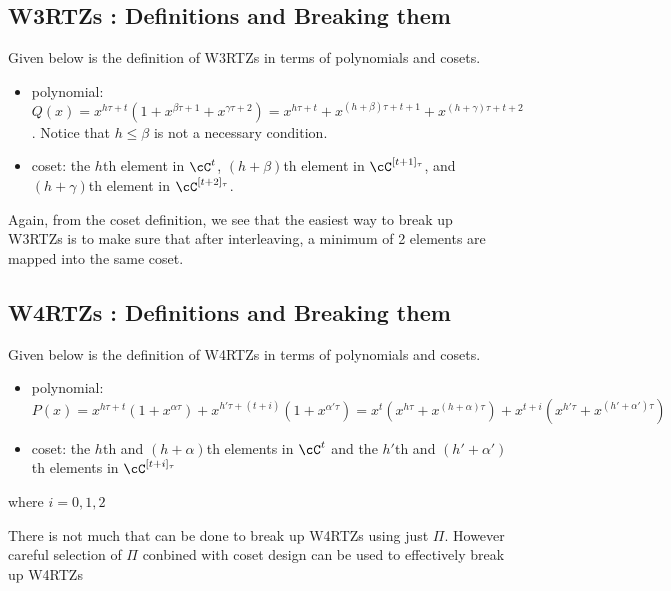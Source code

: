 \subsection{W3RTZs : Definitions and Breaking them}
Given below is the definition of W3RTZs in terms of polynomials and cosets.
\begin{itemize}
	\item polynomial: $Q(x) =x^{h\tau+t}(1+x^{\beta \tau +1}+x^{\gamma \tau +2})=x^{h\tau+t}+x^{(h+\beta) \tau +t+1}+x^{(h+\gamma) \tau +t+2}$. 
	Notice that $h \leq \beta$ is not a necessary condition.
	\item coset: the $h$th element in $\cC^{t}$, $(h+\beta)$th element in $\cC^{[t+1]_\tau}$, and $(h+\gamma)$th element in $\cC^{[t+2]_\tau}$.
\end{itemize}

Again, from the coset definition, we see that the easiest way to break up W3RTZs is to make sure that after interleaving, a minimum of 2 elements are mapped into the same coset.

\subsection{W4RTZs : Definitions and Breaking them}
Given below is the definition of W4RTZs in terms of polynomials and cosets.
\begin{itemize}
	\item polynomial: $P(x)=x^{h\tau+t}(1+x^{\alpha \tau}) + x^{h'\tau+(t+i)}(1+x^{\alpha' \tau})= x^t(x^{h\tau}+x^{(h+\alpha)\tau}) + x^{t+i}(x^{h'\tau}+x^{(h'+\alpha')\tau})$
	\item coset: the $h$th and $(h+\alpha)$th elements in $\cC^t$ and  the $h'$th and $(h'+\alpha')$th elements in $\cC^{[t+i]_\tau}$ 
\end{itemize}
where $i=0,1,2$

There is not much that can be done to break up W4RTZs using just $\Pi$. However careful selection of $\Pi$ conbined with coset design can be used to effectively break up W4RTZs